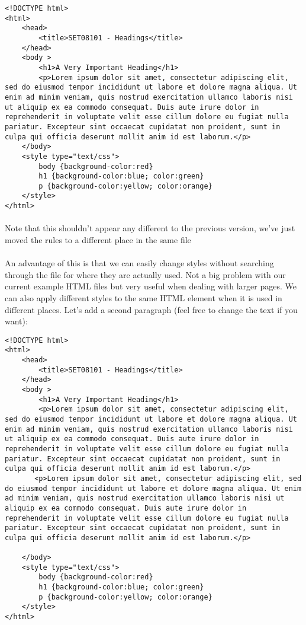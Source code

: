 \documentclass[10pt, a4paper]{article}
\begin{document}
\begin{lstlisting}
<!DOCTYPE html>
<html>
    <head>
        <title>SET08101 - Headings</title>
    </head>
    <body >
        <h1>A Very Important Heading</h1>
        <p>Lorem ipsum dolor sit amet, consectetur adipiscing elit, sed do eiusmod tempor incididunt ut labore et dolore magna aliqua. Ut enim ad minim veniam, quis nostrud exercitation ullamco laboris nisi ut aliquip ex ea commodo consequat. Duis aute irure dolor in reprehenderit in voluptate velit esse cillum dolore eu fugiat nulla pariatur. Excepteur sint occaecat cupidatat non proident, sunt in culpa qui officia deserunt mollit anim id est laborum.</p>
    </body>
    <style type="text/css">
        body {background-color:red}
        h1 {background-color:blue; color:green}
        p {background-color:yellow; color:orange}
    </style>
</html>
\end{lstlisting}

\paragraph{} Note that this shouldn't appear any different to the previous version, we've just moved the rules to a different place in the same file

\paragraph{} An advantage of this is that we can easily change styles without searching through the file for where they are actually used. Not a big problem with our current example HTML files but very useful when dealing with larger pages. We can also apply different styles to the same HTML element when it is used in different places. Let's add a second paragraph (feel free to change the text if you want):

\begin{lstlisting}
<!DOCTYPE html>
<html>
    <head>
        <title>SET08101 - Headings</title>
    </head>
    <body >
        <h1>A Very Important Heading</h1>
        <p>Lorem ipsum dolor sit amet, consectetur adipiscing elit, sed do eiusmod tempor incididunt ut labore et dolore magna aliqua. Ut enim ad minim veniam, quis nostrud exercitation ullamco laboris nisi ut aliquip ex ea commodo consequat. Duis aute irure dolor in reprehenderit in voluptate velit esse cillum dolore eu fugiat nulla pariatur. Excepteur sint occaecat cupidatat non proident, sunt in culpa qui officia deserunt mollit anim id est laborum.</p>
       <p>Lorem ipsum dolor sit amet, consectetur adipiscing elit, sed do eiusmod tempor incididunt ut labore et dolore magna aliqua. Ut enim ad minim veniam, quis nostrud exercitation ullamco laboris nisi ut aliquip ex ea commodo consequat. Duis aute irure dolor in reprehenderit in voluptate velit esse cillum dolore eu fugiat nulla pariatur. Excepteur sint occaecat cupidatat non proident, sunt in culpa qui officia deserunt mollit anim id est laborum.</p>

    </body>
    <style type="text/css">
        body {background-color:red}
        h1 {background-color:blue; color:green}
        p {background-color:yellow; color:orange}
    </style>
</html>
\end{lstlisting}
\end{document}
